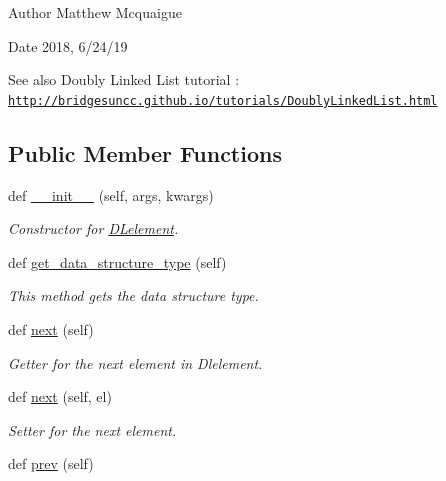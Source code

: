 \begin{DoxyAuthor}{Author}
Matthew Mcquaigue 
\end{DoxyAuthor}
\begin{DoxyDate}{Date}
2018, 6/24/19
\end{DoxyDate}
\begin{DoxySeeAlso}{See also}
Doubly Linked List tutorial \+: \href{http://bridgesuncc.github.io/tutorials/DoublyLinkedList.html}{\tt http\+://bridgesuncc.\+github.\+io/tutorials/\+Doubly\+Linked\+List.\+html} 
\end{DoxySeeAlso}
\subsection*{Public Member Functions}
\begin{DoxyCompactItemize}
\item 
def \hyperlink{classbridges_1_1dl__element_1_1_d_lelement_a54256a7be5796b0471cb2655dd971bd5}{\+\_\+\+\_\+init\+\_\+\+\_\+} (self, args, kwargs)
\begin{DoxyCompactList}\small\item\em Constructor for \hyperlink{classbridges_1_1dl__element_1_1_d_lelement}{D\+Lelement}. \end{DoxyCompactList}\item 
def \hyperlink{classbridges_1_1dl__element_1_1_d_lelement_a5fb177ed67b75e606ac303f7a972d301}{get\+\_\+data\+\_\+structure\+\_\+type} (self)
\begin{DoxyCompactList}\small\item\em This method gets the data structure type. \end{DoxyCompactList}\item 
def \hyperlink{classbridges_1_1dl__element_1_1_d_lelement_a43077e810ec453c9cd512ba75819e28a}{next} (self)
\begin{DoxyCompactList}\small\item\em Getter for the next element in Dlelement. \end{DoxyCompactList}\item 
def \hyperlink{classbridges_1_1dl__element_1_1_d_lelement_ae46f630cd7384689d4305770e6b2c7c1}{next} (self, el)
\begin{DoxyCompactList}\small\item\em Setter for the next element. \end{DoxyCompactList}\item 
def \hyperlink{classbridges_1_1dl__element_1_1_d_lelement_a66e7c4bfb2216a68744fe58c24e9917f}{prev} (self)

\end{DoxyCompactItemize}

